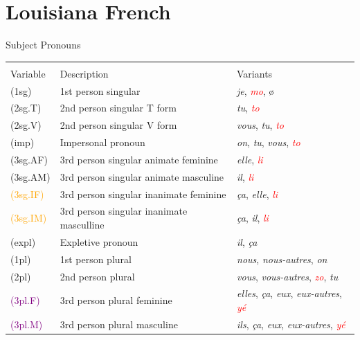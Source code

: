 \documentclass{beamer}\usepackage[]{graphicx}\usepackage[]{xcolor}
\newcommand{\lexi}[1]{\textit{#1}}
\begin{document}
  \section{Louisiana French}
    \begin{frame}{Subject Pronouns}
      \begin{center}
        {\footnotesize
        \begin{tabular}{l l l}
                    &                                          & \\
          Variable  & Description                              & Variants \\
          \hline
          (1sg)     & 1st person singular                      & \lexi{je}, \textcolor{red}{\lexi{mo}}, ø \\
          (2sg.T)   & 2nd person singular T form               & \lexi{tu}, \textcolor{red}{\lexi{to}} \\
          (2sg.V)   & 2nd person singular V form               & \lexi{vous}, \lexi{tu}, \textcolor{red}{\lexi{to}} \\
          (imp)     & Impersonal pronoun                       & \lexi{on}, \lexi{tu}, \lexi{vous}, \textcolor{red}{\lexi{to}} \\
          (3sg.AF)  & 3rd person singular animate feminine     & \lexi{elle}, \textcolor{red}{\lexi{li}} \\
          (3sg.AM)  & 3rd person singular animate masculine    & \lexi{il}, \textcolor{red}{\lexi{li}} \\
          \textcolor{orange}{(3sg.IF)}  & 3rd person singular inanimate feminine   & \lexi{ça}, \lexi{elle}, \textcolor{red}{\lexi{li}} \\
          \textcolor{orange}{(3sg.IM)}  & 3rd person singular inanimate masculline & \lexi{ça}, \lexi{il}, \textcolor{red}{\lexi{li}} \\
          (expl)    & Expletive pronoun                        & \lexi{il}, \lexi{ça} \\
          (1pl)     & 1st person plural                        & \lexi{nous}, \lexi{nous-autres}, \lexi{on} \\
          (2pl)     & 2nd person plural                        & \lexi{vous}, \lexi{vous-autres}, \textcolor{red}{\lexi{zo}}, \lexi{tu} \\
          \textcolor{purple}{(3pl.F)}   & 3rd person plural feminine               & \lexi{elles}, \lexi{ça}, \lexi{eux}, \lexi{eux-autres}, \textcolor{red}{\lexi{yé}} \\
          \textcolor{purple}{(3pl.M)}   & 3rd person plural masculine              & \lexi{ils}, \lexi{ça}, \lexi{eux}, \lexi{eux-autres}, \textcolor{red}{\lexi{yé}} \\
        \end{tabular}
        }
      \end{center}
    \end{frame}
\end{document}

